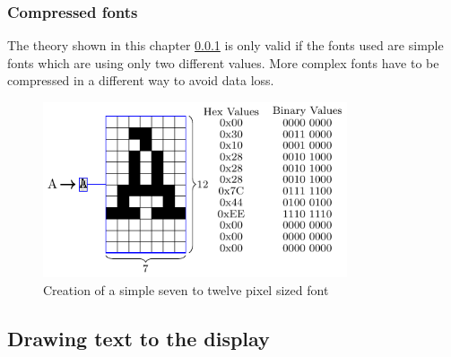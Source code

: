 \subsubsection{Compressed fonts}\label{chapter:CompressedFonts}

The theory shown in this chapter \ref{chapter:CompressedFonts} is only valid if the fonts used are simple fonts which are using only two different values. More complex fonts have to be compressed in a different way to avoid data loss. 
\begin{figure}[H]
	\centering
	\includegraphics[width=0.8\textwidth]{2-theory/drawing-graphics/graphics/font12.pdf}
	\caption{Creation of a simple seven to twelve pixel sized font\label{theory:font12}}
\end{figure}



\subsection{Drawing text to the display}